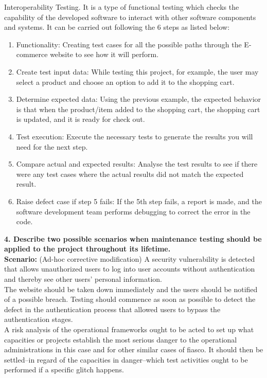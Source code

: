 \documentclass[a4paper,man,natbib]{apa6}
\begin{document}
Interoperability Testing. It is a type of functional testing which checks the capability of the developed software to interact with other software components and systems. It can be carried out following the 6 steps as listed below:\\

\begin{enumerate}
  \item	Functionality: Creating test cases for all the possible paths through the E-commerce website to see how it will perform.
  \item	Create test input data: While testing this project, for example, the user may select a product and choose an option to add it to the shopping cart.
  \item	Determine expected data: Using the previous example, the expected behavior is that when the product/item added to the shopping cart, the shopping cart is updated, and it is ready for check out.
  \item	Test execution: Execute the necessary tests to generate the results you will need for the next step.
  \item	Compare actual and expected results: Analyse the test results to see if there were any test cases where the actual results did not match the expected result.
  \item	Raise defect case if step 5 fails: If the 5th step fails, a report is made, and the software development team performs debugging to correct the error in the code. 
\end{enumerate}

\pagebreak
\noindent
\textbf{4. Describe two possible scenarios when maintenance testing should be applied to the project throughout its lifetime.}\\

\textbf{Scenario:} (Ad-hoc corrective modification) A security vulnerability is detected that allows unauthorized users to log into user accounts without authentication and thereby see other users’ personal information.\\

The website should be taken down immediately and the users should be notified of a possible breach. Testing should commence as soon as possible to detect the defect in the authentication process that allowed users to bypass the authentication stages.\\

A risk analysis of the operational frameworks ought to be acted to set up what capacities or projects establish the most serious danger to the operational administrations in this case and for other similar cases of fiasco. It should then be settled–in regard of the capacities in danger–which test activities ought to be performed if a specific glitch happens.\\
\end{document}

